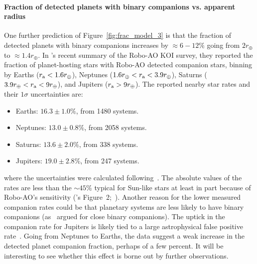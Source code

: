\documentclass[12pt,modern]{aastex61}
\renewcommand{\a}{_{\rm a}}
\begin{document}
\paragraph{Fraction of detected planets with binary companions vs. apparent 
radius}
One further prediction of Figure~\ref{fig:frac_model_3} is that the fraction 
of 
detected planets with binary companions increases by $\approx 6-12\%$ going 
from $2r_\oplus$ to $\approx\! 1.4r_\oplus$.
In \citet{ziegler_robo-ao_2017}'s recent summary of the Robo-AO KOI survey, 
they reported the fraction of planet-hosting stars with Robo-AO detected 
companion stars, binning by Earths ($r\a < 1.6r_\oplus$), Neptunes 
($1.6r_\oplus < r\a < 3.9 r_\oplus$), Saturns ($3.9r_\oplus < r\a < 9 
r_\oplus$), and Jupiters ($r\a > 9r_\oplus$).
The reported nearby star rates and their $1\sigma$ uncertainties are:
\begin{itemize}
    \item Earths: $16.3 \pm 1.0\%$, from 1480 systems.
    \item Neptunes: $13.0 \pm 0.8\%$, from 2058 systems.
    \item Saturns: $13.6 \pm 2.0\%$, from 338 systems.
    \item Jupiters: $19.0 \pm 2.8\%$, from 247 systems.
\end{itemize} 
where the uncertainties were calculated 
following~\citet{burgasser_binarity_2003}.
The absolute values of the rates are less than the $\sim\! 45\%$ typical for 
Sun-like stars at least in part because of Robo-AO's sensitivity 
(\citealt{ziegler_robo-ao_2017}'s Figure~2;~\citealt{raghavan_survey_2010}).
Another reason for the lower measured companion rates could be that planetary 
systems are less likely to have 
binary companions (as~\citealt{kraus_impact_2016} argued for close binary 
companions).
The uptick in the companion rate for Jupiters is likely tied to a large 
astrophysical false positive rate~\citep{santerne_sophie_2012}.
Going from Neptunes to Earths, the data suggest a weak increase in the 
detected planet companion fraction, perhaps of a few percent.
It will be interesting to see whether this effect is borne out by further 
observations.

\end{document}
